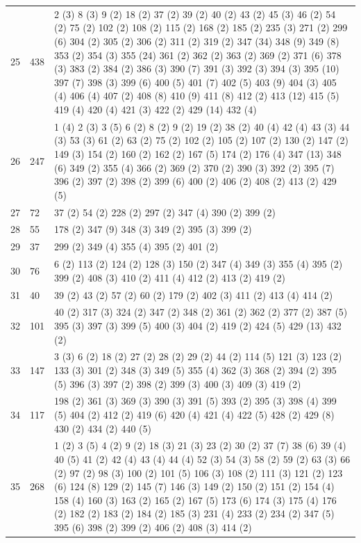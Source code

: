 \begin{landscape}
\begin{longtable}{|p{1.5cm}|p{1.25cm}|p{21cm}|}
25 & 438 & 2 (3) 8 (3) 9 (2) 18 (2) 37 (2) 39 (2) 40 (2) 43 (2) 45 (3) 46 (2) 54 (2) 75 (2) 102 (2) 108 (2) 115 (2) 168 (2) 185 (2) 235 (3) 271 (2) 299 (6) 304 (2) 305 (2) 306 (2) 311 (2) 319 (2) 347 (34) 348 (9) 349 (8) 353 (2) 354 (3) 355 (24) 361 (2) 362 (2) 363 (2) 369 (2) 371 (6) 378 (3) 383 (2) 384 (2) 386 (3) 390 (7) 391 (3) 392 (3) 394 (3) 395 (10) 397 (7) 398 (3) 399 (6) 400 (5) 401 (7) 402 (5) 403 (9) 404 (3) 405 (4) 406 (4) 407 (2) 408 (8) 410 (9) 411 (8) 412 (2) 413 (12) 415 (5) 419 (4) 420 (4) 421 (3) 422 (2) 429 (14) 432 (4) \\
26 & 247 & 1 (4) 2 (3) 3 (5) 6 (2) 8 (2) 9 (2) 19 (2) 38 (2) 40 (4) 42 (4) 43 (3) 44 (3) 53 (3) 61 (2) 63 (2) 75 (2) 102 (2) 105 (2) 107 (2) 130 (2) 147 (2) 149 (3) 154 (2) 160 (2) 162 (2) 167 (5) 174 (2) 176 (4) 347 (13) 348 (6) 349 (2) 355 (4) 366 (2) 369 (2) 370 (2) 390 (3) 392 (2) 395 (7) 396 (2) 397 (2) 398 (2) 399 (6) 400 (2) 406 (2) 408 (2) 413 (2) 429 (5) \\
27 & 72 & 37 (2) 54 (2) 228 (2) 297 (2) 347 (4) 390 (2) 399 (2) \\
28 & 55 & 178 (2) 347 (9) 348 (3) 349 (2) 395 (3) 399 (2) \\
29 & 37 & 299 (2) 349 (4) 355 (4) 395 (2) 401 (2) \\
30 & 76 & 6 (2) 113 (2) 124 (2) 128 (3) 150 (2) 347 (4) 349 (3) 355 (4) 395 (2) 399 (2) 408 (3) 410 (2) 411 (4) 412 (2) 413 (2) 419 (2) \\
31 & 40 & 39 (2) 43 (2) 57 (2) 60 (2) 179 (2) 402 (3) 411 (2) 413 (4) 414 (2) \\
32 & 101 & 40 (2) 317 (3) 324 (2) 347 (2) 348 (2) 361 (2) 362 (2) 377 (2) 387 (5) 395 (3) 397 (3) 399 (5) 400 (3) 404 (2) 419 (2) 424 (5) 429 (13) 432 (2) \\
33 & 147 & 3 (3) 6 (2) 18 (2) 27 (2) 28 (2) 29 (2) 44 (2) 114 (5) 121 (3) 123 (2) 133 (3) 301 (2) 348 (3) 349 (5) 355 (4) 362 (3) 368 (2) 394 (2) 395 (5) 396 (3) 397 (2) 398 (2) 399 (3) 400 (3) 409 (3) 419 (2) \\
34 & 117 & 198 (2) 361 (3) 369 (3) 390 (3) 391 (5) 393 (2) 395 (3) 398 (4) 399 (5) 404 (2) 412 (2) 419 (6) 420 (4) 421 (4) 422 (5) 428 (2) 429 (8) 430 (2) 434 (2) 440 (5) \\
35 & 268 & 1 (2) 3 (5) 4 (2) 9 (2) 18 (3) 21 (3) 23 (2) 30 (2) 37 (7) 38 (6) 39 (4) 40 (5) 41 (2) 42 (4) 43 (4) 44 (4) 52 (3) 54 (3) 58 (2) 59 (2) 63 (3) 66 (2) 97 (2) 98 (3) 100 (2) 101 (5) 106 (3) 108 (2) 111 (3) 121 (2) 123 (6) 124 (8) 129 (2) 145 (7) 146 (3) 149 (2) 150 (2) 151 (2) 154 (4) 158 (4) 160 (3) 163 (2) 165 (2) 167 (5) 173 (6) 174 (3) 175 (4) 176 (2) 182 (2) 183 (2) 184 (2) 185 (3) 231 (4) 233 (2) 234 (2) 347 (5) 395 (6) 398 (2) 399 (2) 406 (2) 408 (3) 414 (2) \\

\end{longtable}
\end{landscape}
